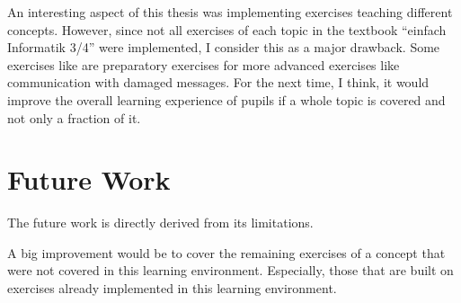 An interesting aspect of this thesis was implementing exercises teaching different concepts. However, since not all exercises of each topic in the textbook “einfach Informatik 3/4” were implemented, I consider this as a major drawback. Some exercises like  are preparatory exercises for more advanced exercises like communication with damaged messages. For the next time, I think, it would improve the overall learning experience of pupils if a whole topic is covered and not only a fraction of it.


\section{Future Work}
\label{section:futureWork}

The future work is directly derived from its limitations.

A big improvement would be to cover the remaining exercises of a concept that were not covered in this learning environment. Especially, those that are built on exercises already implemented in this learning environment.

